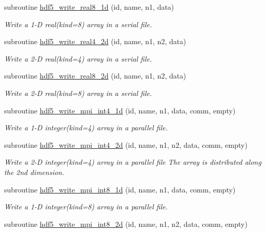 \begin{DoxyCompactItemize}
subroutine \hyperlink{classmodhdf5_aed41c10954f7cb054d46df0c012d147d}{hdf5\-\_\-write\-\_\-real8\-\_\-1d} (id, name, n1, data)
\begin{DoxyCompactList}\small\item\em Write a 1-\/\-D real(kind=8) array in a serial file. \end{DoxyCompactList}\item 
subroutine \hyperlink{classmodhdf5_a71a612d3c6bc8959576fe46d7bab679f}{hdf5\-\_\-write\-\_\-real4\-\_\-2d} (id, name, n1, n2, data)
\begin{DoxyCompactList}\small\item\em Write a 2-\/\-D real(kind=4) array in a serial file. \end{DoxyCompactList}\item 
subroutine \hyperlink{classmodhdf5_a86d263896481bcb679282cede10ab4a1}{hdf5\-\_\-write\-\_\-real8\-\_\-2d} (id, name, n1, n2, data)
\begin{DoxyCompactList}\small\item\em Write a 2-\/\-D real(kind=8) array in a serial file. \end{DoxyCompactList}\item 
subroutine \hyperlink{classmodhdf5_af38c097f92a373ed47962ec1e02f4cb3}{hdf5\-\_\-write\-\_\-mpi\-\_\-int4\-\_\-1d} (id, name, n1, data, comm, empty)
\begin{DoxyCompactList}\small\item\em Write a 1-\/\-D integer(kind=4) array in a parallel file. \end{DoxyCompactList}\item 
subroutine \hyperlink{classmodhdf5_a727abaf04f522d9a2a2accdbf3512a96}{hdf5\-\_\-write\-\_\-mpi\-\_\-int4\-\_\-2d} (id, name, n1, n2, data, comm, empty)
\begin{DoxyCompactList}\small\item\em Write a 2-\/\-D integer(kind=4) array in a parallel file The array is distributed along the 2nd dimension. \end{DoxyCompactList}\item 
subroutine \hyperlink{classmodhdf5_a3402bae4c5e2b0e315c1728b264798da}{hdf5\-\_\-write\-\_\-mpi\-\_\-int8\-\_\-1d} (id, name, n1, data, comm, empty)
\begin{DoxyCompactList}\small\item\em Write a 1-\/\-D integer(kind=8) array in a parallel file. \end{DoxyCompactList}\item 
subroutine \hyperlink{classmodhdf5_a2ca2e47f5fe959ef8cbf3bdad5bef7f8}{hdf5\-\_\-write\-\_\-mpi\-\_\-int8\-\_\-2d} (id, name, n1, n2, data, comm, empty)

\end{DoxyCompactItemize}
